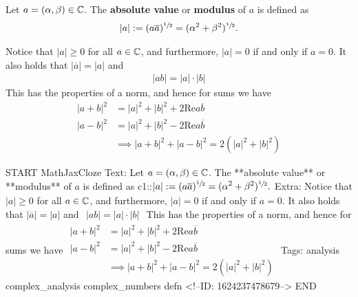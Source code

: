 \documentclass{memoir}
\begin{document}
\begin{defn}[Modulus]
	Let \(a = (\alpha ,\beta ) \in \mathbb{C}\). The \textbf{absolute value} or \textbf{modulus} of \(a\) is defined as
	\begin{align*}
		\left| a \right| := (a \overline{a})^{\sfrac{1}{2}} = (\alpha^2+\beta^2)^{\sfrac{1}{2}}.
	\end{align*}
\end{defn}
	Notice that \(\left| a \right| \geq 0\) for all \(a \in \mathbb{C}\), and furthermore, \(\left| a \right| = 0\) if and only if \(a=0\). It also holds that \(\left| \overline{a} \right| = \left| a \right| \) and 
	\begin{align*}
		\left| ab \right| = \left| a \right| \cdot \left| b \right| 
	\end{align*}
	This has the properties of a norm, and hence for sums we have
	\begin{align*}
		\left| a + b \right|^2 &= \left| a \right|^2 + \left| b \right|^2 + 2 \textrm{Re}a \overline{b}\\
		\left| a-b \right|^2 &= \left| a \right|^2 + \left| b \right|^2 - 2 \textrm{Re} a \overline{b}\\
				     &\implies \left| a+b \right|^2 + \left| a-b \right|^2 = 2\left( \left| a \right|^2 + \left| b \right|^2 \right) 
	\end{align*}

\begin{anki}
START
MathJaxCloze
Text: Let \(a = (\alpha ,\beta ) \in \mathbb{C}\). The **absolute value** or **modulus** of \(a\) is defined as
{{c1::\(\begin{align*}
        	\left| a \right| := (a \overline{a})^{\sfrac{1}{2}} = (\alpha^2+\beta^2)^{\sfrac{1}{2}}.
        \end{align*}\)}} 
Extra: Notice that \(\left| a \right| \geq 0\) for all \(a \in \mathbb{C}\), and furthermore, \(\left| a \right| = 0\) if and only if \(a=0\). It also holds that \(\left| \overline{a} \right| = \left| a \right| \) and 
\(\begin{align*}
  	\left| ab \right| = \left| a \right| \cdot \left| b \right| 
  \end{align*}\)
	This has the properties of a norm, and hence for sums we have
	\(\begin{align*}
	  	\left| a + b \right|^2 &= \left| a \right|^2 + \left| b \right|^2 + 2 \textrm{Re}a \overline{b}\\
	  	\left| a-b \right|^2 &= \left| a \right|^2 + \left| b \right|^2 - 2 \textrm{Re} a \overline{b}\\
	  			     &\implies \left| a+b \right|^2 + \left| a-b \right|^2 = 2\left( \left| a \right|^2 + \left| b \right|^2 \right) 
	  \end{align*}\)
Tags: analysis complex_analysis complex_numbers defn
<!--ID: 1624237478679-->
END
\end{anki}
\end{document}
